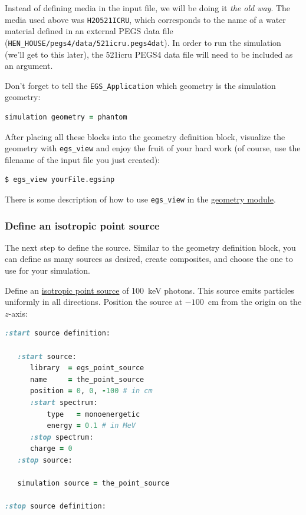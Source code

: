 \documentclass[12pt,twoside]{article}
\begin{document}
Instead of defining media in the input file, we will be doing it \textit{the old way}. The media used above was \Verb+H2O521ICRU+, which corresponds to the name of a water material defined in an external PEGS data file (\Verb+HEN_HOUSE/pegs4/data/521icru.pegs4dat+). In order to run the simulation (we'll get to this later), the 521icru PEGS4 data file will need to be included as an argument.

Don't forget to tell the \Verb+EGS_Application+ which geometry is the simulation
geometry:
\vspace{1ex}

\begin{lstlisting}[language=ruby,backgroundcolor=\color{white}]
simulation geometry = phantom
\end{lstlisting}

After placing all these blocks into the geometry definition block,
visualize the geometry with \Verb+egs_view+ and enjoy the fruit of your hard
work (of course, use the filename of the input file you just created):

\begin{lstlisting}
$ egs_view yourFile.egsinp
\end{lstlisting}

There is some description of how to use \Verb+egs_view+ in the \href{http://nrc-cnrc.github.io/EGSnrc/doc/pirs898/group__Geometry.html#geometry_view}{geometry module}.

\subsubsection{Define an isotropic point source}

The next step to define the source. Similar to the geometry definition block,
you can define as many sources as desired, create composites, and choose the one to use for
your simulation.

Define an \href{http://nrc-cnrc.github.io/EGSnrc/doc/pirs898/classEGS__IsotropicSource.html}{isotropic point source} of 100~keV photons. This source emits particles uniformly in all directions. Position the source at $-100$~cm from the origin on the $z\!$-axis:
\vspace{2ex}

\begin{lstlisting}[language=ruby,backgroundcolor=\color{white}]
:start source definition:

   :start source:
      library  = egs_point_source
      name     = the_point_source
      position = 0, 0, -100 # in cm
      :start spectrum:
          type   = monoenergetic
          energy = 0.1 # in MeV
      :stop spectrum:
      charge = 0
   :stop source:

   simulation source = the_point_source

:stop source definition:
\end{lstlisting}
\vspace{2ex}
\end{document}
